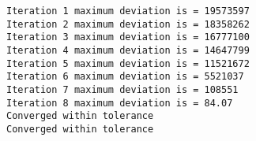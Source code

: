 \documentclass[
  letterpaper,
  DIV=11,
  numbers=noendperiod]{scrartcl}
\newenvironment{Shaded}{\begin{snugshade}}{\end{snugshade}}
\newcommand{\AttributeTok}[1]{\textcolor[rgb]{0.40,0.45,0.13}{#1}}
\newcommand{\ConstantTok}[1]{\textcolor[rgb]{0.56,0.35,0.01}{#1}}
\newcommand{\DecValTok}[1]{\textcolor[rgb]{0.68,0.00,0.00}{#1}}
\newcommand{\FunctionTok}[1]{\textcolor[rgb]{0.28,0.35,0.67}{#1}}
\newcommand{\NormalTok}[1]{\textcolor[rgb]{0.00,0.23,0.31}{#1}}
\newcommand{\OtherTok}[1]{\textcolor[rgb]{0.00,0.23,0.31}{#1}}
\newcommand{\SpecialCharTok}[1]{\textcolor[rgb]{0.37,0.37,0.37}{#1}}
\newcommand{\StringTok}[1]{\textcolor[rgb]{0.13,0.47,0.30}{#1}}
\begin{document}
\begin{Shaded}
\end{Shaded}

\begin{verbatim}
Iteration 1 maximum deviation is = 19573597 
Iteration 2 maximum deviation is = 18358262 
Iteration 3 maximum deviation is = 16777100 
Iteration 4 maximum deviation is = 14647799 
Iteration 5 maximum deviation is = 11521672 
Iteration 6 maximum deviation is = 5521037 
Iteration 7 maximum deviation is = 108551 
Iteration 8 maximum deviation is = 84.07 
Converged within tolerance 
Converged within tolerance 
\end{verbatim}
\end{document}
